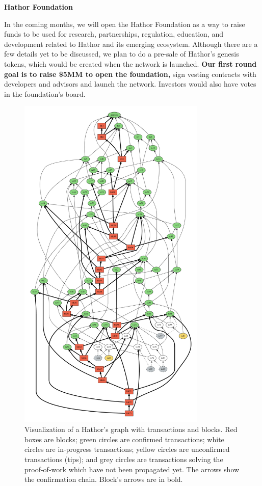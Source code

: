 \documentclass[12pt, a4paper]{article}
\begin{document}
\vspace{1em}
\noindent \textbf{Hathor Foundation}

In the coming months, we will open the Hathor Foundation as a way to raise funds to be used for research, partnerships, regulation, education, and development related to Hathor and its emerging ecosystem. Although there are a few details yet to be discussed, we plan to do a pre-sale of Hathor's genesis tokens, which would be created when the network is launched. \textbf{Our first round goal is to raise \$5MM to open the foundation,} sign vesting contracts with developers and advisors and launch the network. Investors would also have votes in the foundation's board.

\clearpage

\begin{figure}[!htb]
\centering\includegraphics[width=0.8\textwidth]{./images01/sim/hathor-2.pdf}
\caption{Visualization of a Hathor's graph with transactions and blocks. Red boxes are blocks; green circles are confirmed transactions; white circles are in-progress transactions; yellow circles are unconfirmed transactions (tips); and grey circles are transactions solving the proof-of-work which have not been propagated yet. The arrows show the confirmation chain. Block's arrows are in bold. \label{fig:hathor-dag-big}}
\end{figure}
\end{document}
